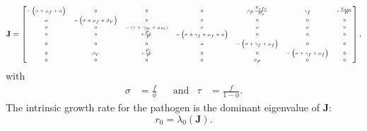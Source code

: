 \documentclass{article}
\newcommand{\mat}[1]{\mathbf{#1}}
\begin{document}
\begin{equation}
  \tiny
  \mat{J} =
  \begin{bmatrix}
    - \left(\sigma + \mu_f + \alpha\right)
    &
    0
    &
    0
    &
    0
    &
    \beta_P \frac{V_{sfs}}{P_s}
    &
    \gamma_f
    &
    \tau \frac{V_{sm}}{P}
    \\
    \alpha
    &
    - \left(\sigma + \mu_f + \beta_V\right)
    &
    0
    &
    0
    &
    0
    &
    0
    &
    0
    \\
    0
    &
    0
    &
    - \left(\tau + \gamma_m + \mu_m\right)
    &
    \sigma
    &
    \sigma
    &
    \sigma
    &
    0
    \\
    0
    &
    0
    &
    \tau \frac{P_s}{P}
    &
    - \left(\sigma + \gamma_f + \mu_f + \alpha\right)
    &
    0
    &
    0
    &
    0
    \\
    0
    &
    0
    &
    0
    &
    \alpha
    &
    - \left(\sigma + \gamma_f + \mu_f\right)
    &
    0
    &
    0
    \\
    0
    &
    \beta_V
    &
    \tau \frac{P_i}{P}
    &
    0
    &
    0
    &
    - \left(\sigma + \gamma_f + \mu_f\right)
    &
    0
    \\
    0
    &
    0
    &
    0
    &
    0
    &
    \beta_P
    &
    0
    &
    0
  \end{bmatrix},
\end{equation}
with
\begin{align}
  \sigma &= \frac{f}{\phi}
  & & \text{and} &
  \tau &= \frac{f}{1 - \phi}.
\end{align}
The intrinsic growth rate for the pathogen is the dominant eigenvalue
of $\mat{J}$:
\begin{equation}
  r_0 = \lambda_0(\mat{J}).
\end{equation}
\end{document}
